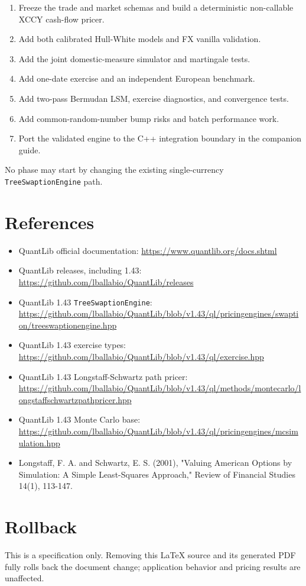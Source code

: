 \documentclass[conference]{IEEEtran}
\newcommand{\passthrough}[1]{#1}
\providecommand{\tightlist}{}
\begin{document}
\begin{enumerate}
\def\labelenumi{\arabic{enumi}.}
\tightlist
\item
  Freeze the trade and market schemas and build a deterministic
  non-callable XCCY cash-flow pricer.
\item
  Add both calibrated Hull-White models and FX vanilla validation.
\item
  Add the joint domestic-measure simulator and martingale tests.
\item
  Add one-date exercise and an independent European benchmark.
\item
  Add two-pass Bermudan LSM, exercise diagnostics, and convergence
  tests.
\item
  Add common-random-number bump risks and batch performance work.
\item
  Port the validated engine to the C++ integration boundary in the
  companion guide.
\end{enumerate}

No phase may start by changing the existing single-currency
\passthrough{\lstinline!TreeSwaptionEngine!} path.

\section{References}\label{14-references}

\begin{itemize}
\tightlist
\item
  QuantLib official documentation:
  \url{https://www.quantlib.org/docs.shtml}
\item
  QuantLib releases, including 1.43:
  \url{https://github.com/lballabio/QuantLib/releases}
\item
  QuantLib 1.43 \passthrough{\lstinline!TreeSwaptionEngine!}:
  \url{https://github.com/lballabio/QuantLib/blob/v1.43/ql/pricingengines/swaption/treeswaptionengine.hpp}
\item
  QuantLib 1.43 exercise types:
  \url{https://github.com/lballabio/QuantLib/blob/v1.43/ql/exercise.hpp}
\item
  QuantLib 1.43 Longstaff-Schwartz path pricer:
  \url{https://github.com/lballabio/QuantLib/blob/v1.43/ql/methods/montecarlo/longstaffschwartzpathpricer.hpp}
\item
  QuantLib 1.43 Monte Carlo base:
  \url{https://github.com/lballabio/QuantLib/blob/v1.43/ql/pricingengines/mcsimulation.hpp}
\item
  Longstaff, F. A. and Schwartz, E. S. (2001), "Valuing American Options
  by Simulation: A Simple Least-Squares Approach," Review of Financial
  Studies 14(1), 113-147.
\end{itemize}

\section{Rollback}\label{rollback}

This is a specification only. Removing this LaTeX source and its
generated PDF fully rolls back the document change; application behavior
and pricing results are unaffected.
\end{document}
